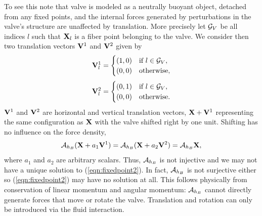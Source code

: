 To see this note that valve is modeled as a neutrally buoyant object, detached from any fixed points, and the internal forces generated by perturbations in the valve's structure are unaffected by translation. More precisely let $\mathcal{G}_V$ be all indices $l$ such that $\mathbf{X}_l$ is a fiber point belonging to the valve. We consider then two translation vectors $\mathbf{V}^1$ and $\mathbf{V}^2$ given by
\begin{equation}
\mathbf{V}^1_l =
\begin{cases}
(1,0)& \textrm{if } l\in \mathcal{G}_V, \\
(0,0)& \textrm{otherwise},
\end{cases}
\end{equation}
\begin{equation}
\mathbf{V}^2_l =
\begin{cases}
(0,1)& \textrm{if } l\in \mathcal{G}_V, \\
(0,0)& \textrm{otherwise}.
\end{cases}
\end{equation}
$\mathbf{V}^1$ and $\mathbf{V}^2$ are horizontal and vertical translation vectors, $\mathbf{X}+\mathbf{V}^1$ representing the same configuration as $\mathbf{X}$ with the valve shifted right by one unit. Shifting has no influence on the force density,
\begin{equation}
\mathcal{A}_{h_B}(\mathbf{X}+a_1 \mathbf{V}^1) = \mathcal{A}_{h_B}(\mathbf{X}+a_2 \mathbf{V}^2) = \mathcal{A}_{h_B}\mathbf{X},
\end{equation}
where $a_1$ and $a_2$ are arbitrary scalars.
Thus,  $\mathcal{A}_{h_B}$ is not injective and we may not have a unique solution to (\ref{eqn:fixedpoint2}). In fact, $\mathcal{A}_{h_B}$ is not surjective either so (\ref{eqn:fixedpoint2}) may have no solution at all. This follows physically from conservation of linear momentum and angular momentum: $\mathcal{A}_{h_B}$ cannot directly generate forces that move or rotate the valve. Translation and rotation can only be introduced via the fluid interaction. 

